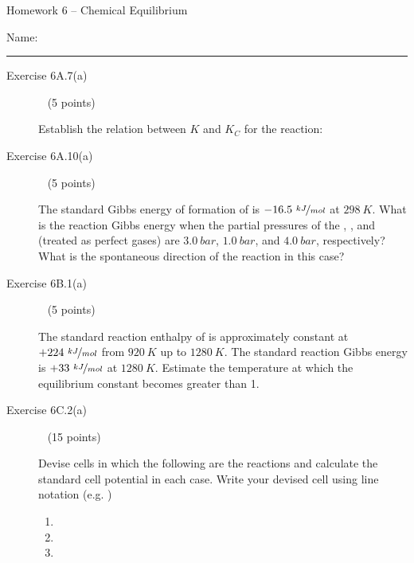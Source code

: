 \documentclass[12pt, openany, letterpaper]{memoir}
\begin{document}
\begin{center}
	{\large Homework 6 -- Chemical Equilibrium}
	
\end{center}

Name: \rule[-.1mm]{15em}{0.1pt}

\begin{description}	
	\item [Exercise 6A.7(a)] ~ (5 points)
	
	Establish the relation between $K$ and $K_C$ for the reaction: 
	
	\vspace{18em}
	\item [Exercise 6A.10(a)] ~ (5 points)
	
	The standard Gibbs energy of formation of  is $-16.5~\nicefrac{kJ}{mol}$ at $298~K$. What is the reaction Gibbs energy when the partial pressures of the , , and  (treated as perfect gases) are $3.0~bar$, $1.0~bar$, and $4.0~bar$, respectively? What is the spontaneous direction of the reaction in this case?
	
	\vspace{20em}
	\item [Exercise 6B.1(a)] ~ (5 points)
	
	The standard reaction enthalpy of  is approximately constant at $+224~\nicefrac{kJ}{mol}$ from $920~K$ up to $1280~K$. The standard reaction Gibbs energy is $+33~\nicefrac{kJ}{mol}$ at $1280~K$. Estimate the temperature at which the equilibrium constant becomes greater than 1.
	
	\vspace{20em}
	
	
	\vspace{2em}
	\item [Exercise 6C.2(a)] ~ (15 points)
	
	Devise cells in which the following are the reactions and calculate the standard cell potential in each case. Write your devised cell using line notation (e.g. )
	\begin{enumerate}
		\item {}
		
		\vspace{6em}
		\item {}
		
		\vspace{6em}
		\item {}
	\end{enumerate}
	

\end{description}
\end{document}
